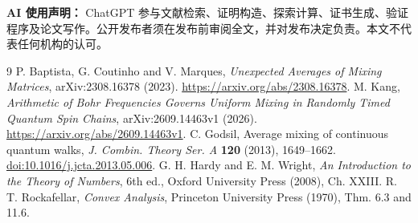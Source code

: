 \documentclass[11pt,a4paper]{article}
\begin{document}
\noindent\textbf{AI 使用声明：} ChatGPT 参与文献检索、证明构造、探索计算、证书生成、验证程序及论文写作。公开发布者须在发布前审阅全文，并对发布决定负责。本文不代表任何机构的认可。
\begin{thebibliography}{9}
 P. Baptista, G. Coutinho and V. Marques, \emph{Unexpected Averages of Mixing Matrices}, arXiv:2308.16378 (2023). \url{https://arxiv.org/abs/2308.16378}.
 M. Kang, \emph{Arithmetic of Bohr Frequencies Governs Uniform Mixing in Randomly Timed Quantum Spin Chains}, arXiv:2609.14463v1 (2026). \url{https://arxiv.org/abs/2609.14463v1}.
 C. Godsil, Average mixing of continuous quantum walks, \emph{J. Combin. Theory Ser. A} \textbf{120} (2013), 1649--1662. \href{https://doi.org/10.1016/j.jcta.2013.05.006}{doi:10.1016/j.jcta.2013.05.006}.
 G. H. Hardy and E. M. Wright, \emph{An Introduction to the Theory of Numbers}, 6th ed., Oxford University Press (2008), Ch. XXIII.
 R. T. Rockafellar, \emph{Convex Analysis}, Princeton University Press (1970), Thm. 6.3 and 11.6.
\end{thebibliography}
\end{document}
